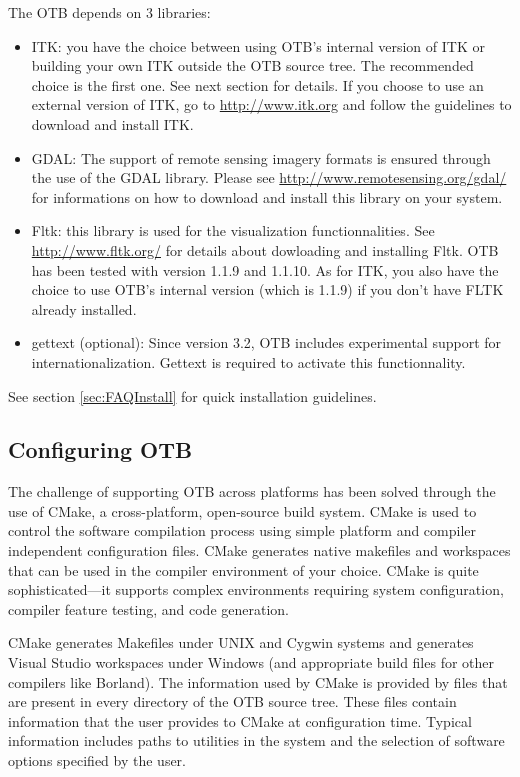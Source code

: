 The OTB depends on 3 libraries:
\begin{itemize}
  \item ITK: you have the choice between using OTB's internal version
  of ITK or building your own ITK outside the OTB source tree. The
  recommended choice is the first one. See next section for
  details. If you choose to use an external version of ITK, go to
  \url{http://www.itk.org} and follow the guidelines to download and
  install ITK.
  \item GDAL: The support of remote sensing imagery formats is ensured
    through the use of the GDAL library. Please see
\url{http://www.remotesensing.org/gdal/} for informations on how to
download and install this library on your system.
\item Fltk: this library is used for the visualization
  functionnalities. See \url{http://www.fltk.org/} for details about
  dowloading and installing Fltk. OTB has been tested with version 1.1.9
  and 1.1.10. As for ITK, you also have the choice to use OTB's internal
  version (which is 1.1.9) if you don't have FLTK already installed.
\item gettext (optional): Since version 3.2, OTB includes experimental support 
  for internationalization. Gettext is required to activate this 
  functionnality.  
\end{itemize}

See section \ref{sec:FAQInstall} for quick installation guidelines.

\subsection{Configuring OTB}
\label{sec:ConfiguringOTB}


The challenge of supporting OTB across platforms has been solved through the
use of CMake, a cross-platform, open-source build system. CMake is used to
control the software compilation process using simple platform and compiler
independent configuration files.  CMake generates native makefiles and
workspaces that can be used in the compiler environment of your choice. CMake
is quite sophisticated---it supports complex environments requiring system
configuration, compiler feature testing, and code generation.

CMake generates Makefiles under UNIX and Cygwin systems and generates Visual
Studio workspaces under Windows (and appropriate build files for other
compilers like Borland). The information used by CMake is provided by
 files that are present in every directory of the OTB
source tree. These files contain information that the user
provides to CMake at configuration time. Typical information includes paths
to utilities in the system and the selection of software options specified by
the user.

